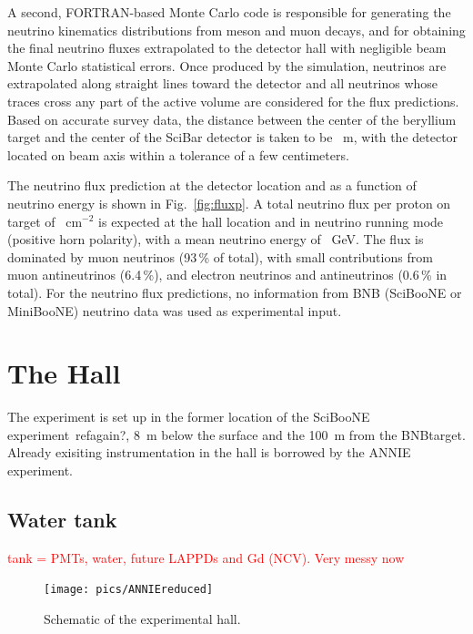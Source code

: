 A second, FORTRAN-based Monte Carlo code is responsible for generating the neutrino %
kinematics distributions from meson and muon decays, and for obtaining the final neutrino %
fluxes extrapolated to the detector hall with negligible beam Monte Carlo statistical errors. 
Once produced by the simulation, neutrinos are extrapolated along straight lines %
toward the detector and all neutrinos whose traces cross any part of the active volume are %
considered for the flux predictions.
Based on accurate survey data, the distance between the center of the beryllium %
target and the center of the SciBar detector is taken to be ~m, %
with the detector located on beam axis within a tolerance of a few centimeters. 

The neutrino flux prediction at the detector location and as a function %
of neutrino energy is shown in Fig.~\ref{fig:fluxp}.
A total neutrino flux per proton on target of ~cm$^{-2}$ is expected at the %
hall location and in neutrino running mode (positive horn polarity), with %
a mean neutrino energy of ~GeV. 
The flux is dominated by muon neutrinos (93\,\% of total), with small contributions from %
muon antineutrinos (6.4\,\%), and electron neutrinos and antineutrinos (0.6\,\% in total). 
For the neutrino flux predictions, no information from BNB %
(SciBooNE or MiniBooNE) neutrino data was used as experimental input.

\section{The Hall}

The experiment is set up in the former location of the SciBooNE experiment~refagain?, %
8~m below the surface and the 100~m from the BNBtarget.
Already exisiting instrumentation in the hall is borrowed by the ANNIE experiment.

\subsection{Water tank}
\label{2.2}
\textcolor{red}{tank = PMTs, water, future LAPPDs and Gd (NCV). Very messy now}

\begin{figure}
  \centering
  \texttt{[image: pics/ANNIEreduced]}
  \caption{Schematic of the experimental hall.}
  \label{fig:anniehall}
\end{figure}

